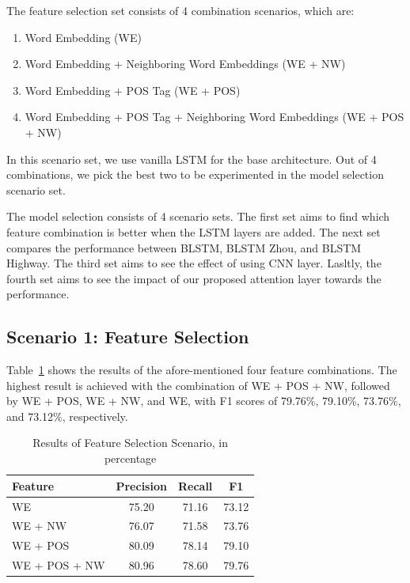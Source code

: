 The feature selection set consists of 4 combination scenarios, which are:
\begin{enumerate}
	\item Word Embedding (WE)
	\item Word Embedding + Neighboring Word Embeddings (WE + NW)
	\item Word Embedding + POS Tag (WE + POS)
	\item Word Embedding + POS Tag + Neighboring Word Embeddings (WE + POS + NW)
\end{enumerate}

In this scenario set, we use vanilla LSTM for the base architecture. Out of 4 combinations, we pick the best two to be experimented in the model selection scenario set.

The model selection consists of 4 scenario sets. The first set aims to find which feature combination is better when the LSTM layers are added. The next set compares the performance between BLSTM, BLSTM Zhou, and BLSTM Highway. The third set aims to see the effect of using CNN layer. Lasltly, the fourth set aims to see the impact of our proposed attention layer towards the performance.

\subsection{Scenario 1: Feature Selection}
Table~\ref{tab:feature_scenario} shows the results of the afore-mentioned four feature combinations. The highest result is achieved with the combination of WE + POS + NW, followed by WE + POS, WE + NW, and WE, with F1 scores of 79.76\%, 79.10\%, 73.76\%, and 73.12\%, respectively. 

\begin{table}
	\centering
	\caption{Results of Feature Selection Scenario, in percentage}
	\label{tab:feature_scenario}
	\begin{tabular}{lccc}
		\hline
		Feature & Precision & Recall & F1 \\
		\hline\hline
		WE & 75.20 & 71.16 & 73.12 \\
		WE + NW & 76.07 & 71.58 & 73.76 \\
		WE + POS & 80.09 & 78.14 & 79.10 \\
		WE + POS + NW & 80.96 & 78.60 & 79.76 \\
		\hline
	\end{tabular}

\end{table}

